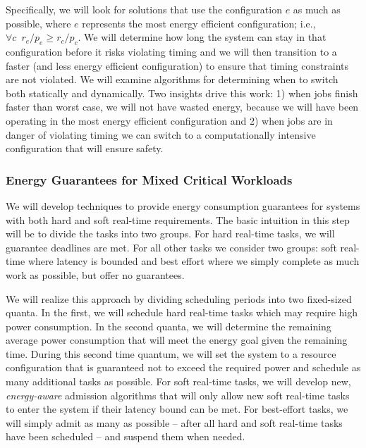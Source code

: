 Specifically, we will look for solutions that use the configuration
$e$ as much as possible, where $e$ represents the most energy
efficient configuration; i.e., $\forall c \,\,\, r_e /p_e \ge
r_c/p_c$.  We will determine how long the system can stay in that
configuration before it risks violating timing and we will then
transition to a faster (and less energy efficient configuration) to
ensure that timing constraints are not violated.  We will examine
algorithms for determining when to switch both statically and
dynamically.  Two insights drive this work: 1) when jobs finish faster
than worst case, we will not have wasted energy, because we will have
been operating in the most energy efficient configuration and 2) when
jobs are in danger of violating timing we can switch to a
computationally intensive configuration that will ensure safety.



\subsubsection{Energy Guarantees for Mixed Critical Workloads}
We will develop techniques to provide energy consumption guarantees
for systems with both hard and soft real-time requirements.  The basic
intuition in this step will be to divide the tasks into two groups.
For hard real-time tasks, we will guarantee deadlines are met.  For
all other tasks we consider two groups: soft real-time where latency
is bounded and best effort where we simply complete as much work as
possible, but offer no guarantees.

We will realize this approach by dividing scheduling periods into two
fixed-sized quanta.  In the first, we will schedule hard real-time
tasks which may require high power consumption.  In the second quanta,
we will determine the remaining average power consumption that will
meet the energy goal given the remaining time.  During this second
time quantum, we will set the system to a resource configuration that
is guaranteed not to exceed the required power and schedule as many
additional tasks as possible.  For soft real-time tasks, we will
develop new, \emph{energy-aware} admission algorithms that will only
allow new soft real-time tasks to enter the system if their latency
bound can be met.  For best-effort tasks, we will simply admit as many
as possible -- after all hard and soft real-time tasks have been
scheduled -- and suspend them when needed.

